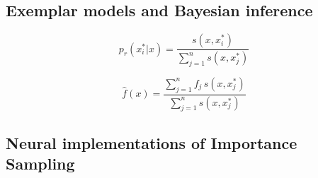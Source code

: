 \documentclass[10pt,letterpaper]{article}
\begin{document}
\cite{Shi2010}

\subsection{Exemplar models and Bayesian inference}





\begin{equation}
	p_{r}(x^{*}_{i}|x)=\frac{s(x,x^{*}_{i})}{\sum^{n}_{j=1}s(x,x^{*}_{j})}
\end{equation}

\cite{ashby1995categorization}


\begin{equation}
	\hat{f}(x)=\frac{\sum^{n}_{j=1}f_{j}\,s(x,x^{*}_{j})}{\sum^{n}_{j=1}s(x,x^{*}_{j})}
\end{equation}



\cite{neal1993probabilistic,Shi2010}

\subsection{Neural implementations of Importance Sampling}
\cite{Shi2009}
\end{document}
